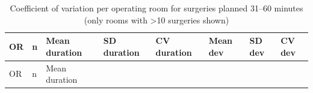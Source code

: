 \documentclass[
]{article}
\begin{document}
\begin{longtable}[]{@{}
  >{\centering\arraybackslash}p{}
  >{\centering\arraybackslash}p{}
  >{\centering\arraybackslash}p{}
  >{\centering\arraybackslash}p{}
  >{\centering\arraybackslash}p{}
  >{\centering\arraybackslash}p{}
  >{\centering\arraybackslash}p{}
  >{\centering\arraybackslash}p{}@{}}
\caption{Coefficient of variation per operating room for surgeries
planned 31--60 minutes (only rooms with \textgreater10 surgeries shown)
\label{tab:cv_room_31_60}}\tabularnewline
\toprule\noalign{}
\begin{minipage}[b]{\linewidth}\centering
OR
\end{minipage} & \begin{minipage}[b]{\linewidth}\centering
n
\end{minipage} & \begin{minipage}[b]{\linewidth}\centering
Mean duration
\end{minipage} & \begin{minipage}[b]{\linewidth}\centering
SD duration
\end{minipage} & \begin{minipage}[b]{\linewidth}\centering
CV duration
\end{minipage} & \begin{minipage}[b]{\linewidth}\centering
Mean dev
\end{minipage} & \begin{minipage}[b]{\linewidth}\centering
SD dev
\end{minipage} & \begin{minipage}[b]{\linewidth}\centering
CV dev
\end{minipage} \\
\midrule\noalign{}
\endfirsthead
\toprule\noalign{}
\begin{minipage}[b]{\linewidth}\centering
OR
\end{minipage} & \begin{minipage}[b]{\linewidth}\centering
n
\end{minipage} & \begin{minipage}[b]{\linewidth}\centering
Mean duration
\end{minipage} & \begin{minipage}[b]{\linewidth}\centering

\end{minipage}
\end{longtable}
\end{document}
